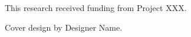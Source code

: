 \vspace*{1cm}
This research received funding from Project XXX.

\vspace*{\fill}
Cover design by Designer Name.